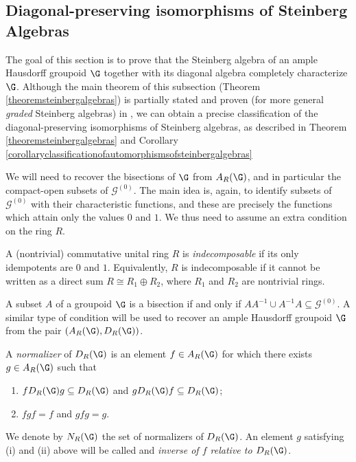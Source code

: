 \subsection{Diagonal-preserving isomorphisms of Steinberg Algebras}

The goal of this section is to prove that the Steinberg algebra of an ample Hausdorff groupoid $\G$ together with its diagonal algebra completely characterize $\G$. Although the main theorem of this subsection (Theorem \ref{theoremsteinbergalgebras}) is partially stated and proven (for more general \emph{graded} Steinberg algebras) in \cite[Corollary 3.14]{MR3848066}, we can obtain a precise classification of the diagonal-preserving isomorphisms of Steinberg algebras, as described in Theorem \ref{theoremsteinbergalgebras} and Corollary \ref{corollaryclassificationofautomorphismsofsteinbergalgebras}

We will need to recover the bisections of $\G$ from $A_R(\G)$, and in particular the compact-open subsets of $\mathcal{G}^{(0)}$. The main idea is, again, to identify subsets of $\mathcal{G}^{(0)}$ with their characteristic functions, and these are precisely the functions which attain only the values $0$ and $1$. We thus need to assume an extra condition on the ring $R$.

\begin{definition}[{\cite[X.7]{MR1878556}}]
A (nontrivial) commutative unital ring $R$ is \emph{indecomposable} if its only idempotents are $0$ and $1$. Equivalently, $R$ is indecomposable if it cannot be written as a direct sum $R\cong R_1\oplus R_2$, where $R_1$ and $R_2$ are nontrivial rings.
\end{definition}

A subset $A$ of a groupoid $\G$ is a bisection if and only if $AA^{-1}\cup A^{-1}A\subseteq \mathcal{G}^{(0)}$. A similar type of condition will be used to recover an ample Hausdorff groupoid $\G$ from the pair $(A_R(\G),D_R(\G))$.

\begin{definition}
A \emph{normalizer} of $D_R(\G)$ is an element $f\in A_R(\G)$ for which there exists $g\in A_R(\G)$ such that
\begin{enumerate}
\item[(i)] $fD_R(\G)g\subseteq D_R(\G)$ and $gD_R(\G)f\subseteq D_R(\G)$;
\item[(ii)] $fgf=f$ and $gfg=g$.
\end{enumerate}
We denote by $N_R(\G)$ the set of normalizers of $D_R(\G)$. An element $g$ satisfying (i) and (ii) above will be called and \emph{inverse of $f$ relative to $D_R(\G)$}.
\end{definition}


